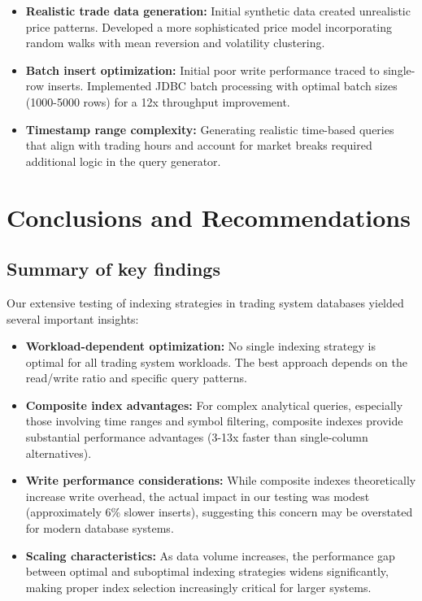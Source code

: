 \documentclass[11pt,a4paper]{article}
\begin{document}
\begin{itemize}
    \item \textbf{Realistic trade data generation:} Initial synthetic data created unrealistic price patterns. Developed a more sophisticated price model incorporating random walks with mean reversion and volatility clustering.
    
    \item \textbf{Batch insert optimization:} Initial poor write performance traced to single-row inserts. Implemented JDBC batch processing with optimal batch sizes (1000-5000 rows) for a 12x throughput improvement.
    
    \item \textbf{Timestamp range complexity:} Generating realistic time-based queries that align with trading hours and account for market breaks required additional logic in the query generator.
\end{itemize}

\section{Conclusions and Recommendations}

\subsection{Summary of key findings}

Our extensive testing of indexing strategies in trading system databases yielded several important insights:

\begin{itemize}
    \item \textbf{Workload-dependent optimization:} No single indexing strategy is optimal for all trading system workloads. The best approach depends on the read/write ratio and specific query patterns.
    
    \item \textbf{Composite index advantages:} For complex analytical queries, especially those involving time ranges and symbol filtering, composite indexes provide substantial performance advantages (3-13x faster than single-column alternatives).
    
    \item \textbf{Write performance considerations:} While composite indexes theoretically increase write overhead, the actual impact in our testing was modest (approximately 6\% slower inserts), suggesting this concern may be overstated for modern database systems.
    
    \item \textbf{Scaling characteristics:} As data volume increases, the performance gap between optimal and suboptimal indexing strategies widens significantly, making proper index selection increasingly critical for larger systems.
\end{itemize}
\end{document}
